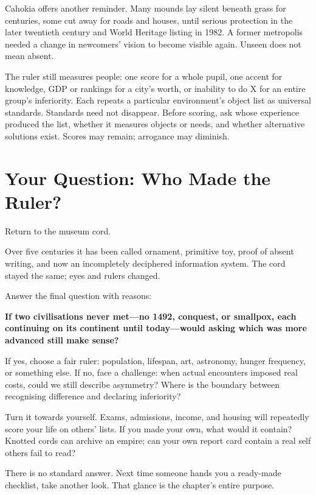 Cahokia offers another reminder. Many mounds lay silent beneath grass for centuries, some cut away for roads and houses, until serious protection in the later twentieth century and World Heritage listing in 1982. A former metropolis needed a change in newcomers' vision to become visible again. Unseen does not mean absent.

The ruler still measures people: one score for a whole pupil, one accent for knowledge, GDP or rankings for a city's worth, or inability to do X for an entire group's inferiority. Each repeats a particular environment's object list as universal standards. Standards need not disappear. Before scoring, ask whose experience produced the list, whether it measures objects or needs, and whether alternative solutions exist. Scores may remain; arrogance may diminish.

\section{Your Question: Who Made the Ruler?}
Return to the museum cord.

Over five centuries it has been called ornament, primitive toy, proof of absent writing, and now an incompletely deciphered information system. The cord stayed the same; eyes and rulers changed.

Answer the final question with reasons:

\textbf{If two civilisations never met---no 1492, conquest, or smallpox, each continuing on its continent until today---would asking which was more advanced still make sense?}

If yes, choose a fair ruler: population, lifespan, art, astronomy, hunger frequency, or something else. If no, face a challenge: when actual encounters imposed real costs, could we still describe asymmetry? Where is the boundary between recognising difference and declaring inferiority?

Turn it towards yourself. Exams, admissions, income, and housing will repeatedly score your life on others' lists. If you made your own, what would it contain? Knotted cords can archive an empire; can your own report card contain a real self others fail to read?

There is no standard answer. Next time someone hands you a ready-made checklist, take another look. That glance is the chapter's entire purpose.
